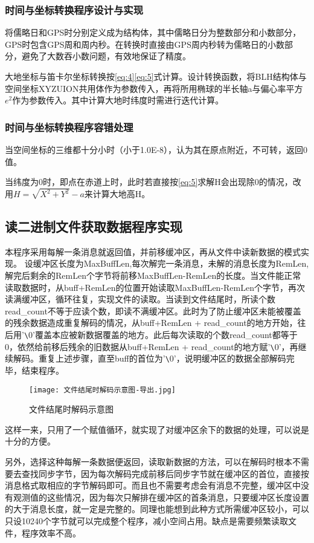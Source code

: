 \documentclass{ctexart}
\begin{document}
\subsubsection{时间与坐标转换程序设计与实现}
将儒略日和GPS时分别定义成为结构体，其中儒略日分为整数部分和小数部分，GPS时包含GPS周和周内秒。在转换时直接由GPS周内秒转为儒略日的小数部分，避免了大数吞小数问题，有效地保证了精度。

大地坐标与笛卡尔坐标转换按\eqref{eq:4}\eqref{eq:5}式计算。设计转换函数，将BLH结构体与空间坐标XYZUION共用体作为参数传入，再将所用椭球的半长轴a与偏心率平方$e^2$作为参数传入。其中计算大地时纬度时需进行迭代计算。
\subsubsection{时间与坐标转换程序容错处理}
当空间坐标的三维都十分小时（小于1.0E-8），认为其在原点附近，不可转，返回0值。

当纬度为0时，即点在赤道上时，此时若直接按\eqref{eq:5}求解H会出现除0的情况，改用$H=\sqrt{X^2+Y^2}-a$来计算大地高H。
\vfill
\subsection{读二进制文件获取数据程序实现}
本程序采用每解一条消息就返回值，并前移缓冲区，再从文件中读新数据的模式实现。
设缓冲区长度为MaxBuffLen,每次解完一条消息，未解的消息长度为RemLen,解完后剩余的RemLen个字节将前移MaxBuffLen-RemLen的长度。当文件能正常读取数据时，从buff+RemLen的位置开始读取MaxBuffLen-RemLen个字节，再次读满缓冲区，循环往复，实现文件的读取。当读到文件结尾时，所读个数read\_count不等于应读个数，即读不满缓冲区。此时为了防止缓冲区未能被覆盖的残余数据造成重复解码的情况，从buff+RemLen + read\_count的地方开始，往后用'\verb|\|0'覆盖本应被新数据覆盖的地方。此后每次读取的个数read\_count都等于0，依然给前移后残余的旧数据从buff+RemLen + read\_count的地方赋'\verb|\|0'，再继续解码。重复上述步骤，直至buff的首位为'\verb|\|0'，说明缓冲区的数据全部解码完毕，结束程序。
\begin{figure}[H]
\texttt{[image: 文件结尾时解码示意图-导出.jpg]}
\caption{文件结尾时解码示意图}
\end{figure}
这样一来，只用了一个赋值循环，就实现了对缓冲区余下的数据的处理，可以说是十分的方便。

另外，选择这种每解一条数据便返回，读取新数据的方法，可以在解码时根本不需要去查找同步字节，因为每次解码完成前移后同步字节就在缓冲区的首位，直接按消息格式取相应的字节解码即可。而且也不需要考虑会有消息不完整，缓冲区中没有观测值的这些情况，因为每次只解排在缓冲区的首条消息，只要缓冲区长度设置的大于消息长度，就一定是完整的。同理也能想到此种方式所需缓冲区较小，可以只设10240个字节就可以完成整个程序，减小空间占用。缺点是需要频繁读取文件，程序效率不高。
\end{document}
